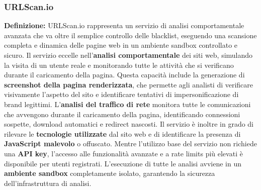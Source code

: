 \documentclass{article}
\begin{document}
\subsubsection{URLScan.io}
\textbf{Definizione:} URLScan.io rappresenta un servizio di analisi comportamentale avanzata che va oltre il semplice controllo delle blacklist, eseguendo una scansione completa e dinamica delle pagine web in un ambiente sandbox controllato e sicuro.
\newline \newline
Il servizio eccelle nell'\textbf{analisi comportamentale} dei siti web, simulando la visita di un utente reale e monitorando tutte le attività che si verificano durante il caricamento della pagina. Questa capacità include la generazione di \textbf{screenshot della pagina renderizzata}, che permette agli analisti di verificare visivamente l'aspetto del sito e identificare tentativi di impersonificazione di brand legittimi.
\newline \newline
L'\textbf{analisi del traffico di rete} monitora tutte le comunicazioni che avvengono durante il caricamento della pagina, identificando connessioni sospette, download automatici e redirect nascosti. Il servizio è inoltre in grado di rilevare le \textbf{tecnologie utilizzate} dal sito web e di identificare la presenza di \textbf{JavaScript malevolo} o offuscato.
\newline \newline
Mentre l'utilizzo base del servizio non richiede una \textbf{API key}, l'accesso alle funzionalità avanzate e a rate limits più elevati è disponibile per utenti registrati. L'esecuzione di tutte le analisi avviene in un \textbf{ambiente sandbox} completamente isolato, garantendo la sicurezza dell'infrastruttura di analisi.
\end{document}
